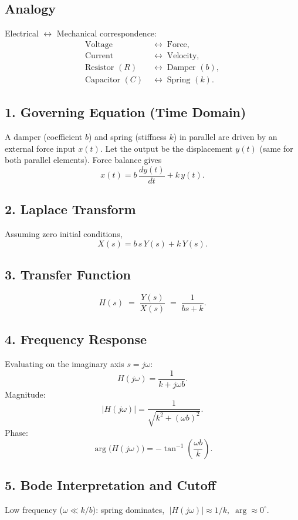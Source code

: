 \documentclass[a4paper,12pt]{article}
\begin{document}
	\subsection*{Analogy}
	Electrical $\leftrightarrow$ Mechanical correspondence:
	$$
	\begin{aligned}
		\text{Voltage} &\;\leftrightarrow\; \text{Force}, \\
		\text{Current} &\;\leftrightarrow\; \text{Velocity}, \\
		\text{Resistor }(R) &\;\leftrightarrow\; \text{Damper }(b), \\
		\text{Capacitor }(C) &\;\leftrightarrow\; \text{Spring }(k).
	\end{aligned}
	$$
	
	
	\subsection*{1. Governing Equation (Time Domain)}
	A damper (coefficient $b$) and spring (stiffness $k$) in parallel are driven by an external force input $x(t)$.
	Let the output be the displacement $y(t)$ (same for both parallel elements). Force balance gives
	$$
	x(t) = b\,\frac{dy(t)}{dt} + k\,y(t).
	$$
	
	\subsection*{2. Laplace Transform}
	Assuming zero initial conditions,
	$$
	X(s) = b\,s\,Y(s) + k\,Y(s).
	$$
	
	\subsection*{3. Transfer Function}
	$$
	H(s) \;=\; \frac{Y(s)}{X(s)} \;=\; \frac{1}{b s + k}.
	$$
	
	\subsection*{4. Frequency Response}
	Evaluating on the imaginary axis $s=j\omega$:
	$$
	H(j\omega) = \frac{1}{k + j\omega b}.
	$$
	Magnitude:
	$$
	\big|H(j\omega)\big| = \frac{1}{\sqrt{k^2 + (\omega b)^2}}.
	$$
	Phase:
	$$
	\arg\!\big(H(j\omega)\big) = -\tan^{-1}\!\left(\frac{\omega b}{k}\right).
	$$
	
	\subsection*{5. Bode Interpretation and Cutoff}
	Low frequency ($\omega \ll k/b$): spring dominates, $\;|H(j\omega)| \approx 1/k,\; \arg \approx 0^\circ.$
	
\end{document}
